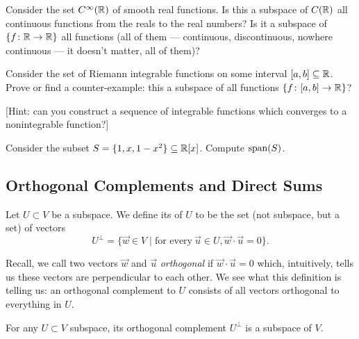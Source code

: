 \begin{exercise}
Consider the set $C^{\infty}(\mathbb{R})$ of smooth real functions.
Is this a subspace of $C(\mathbb{R})$ all continuous functions from the reals
to the real numbers?
Is it a subspace of $\{f\colon\mathbb{R}\to\mathbb{R}\}$ all functions (all of them --- continuous,
discontinuous, nowhere continuous --- it doesn't matter, all of them)?
\end{exercise}

\begin{exercise}
Consider the set of Riemann integrable functions on some interval
$[a,b]\subseteq\mathbb{R}$. Prove or find a counter-example: this a subspace of all functions $\{f\colon[a,b]\to\mathbb{R}\}$?

[Hint: can you construct a sequence of integrable functions which
  converges to a nonintegrable function?]
\end{exercise}

\begin{exercise}
Consider the subset $S = \{1,x,1-x^{2}\}\subseteq\mathbb{R}[x]$. Compute $\operatorname{span}(S)$.
\end{exercise}

\subsection{Orthogonal Complements and Direct Sums}

\begin{definition}
Let $U\subset V$ be a subspace. We define its 
of $U$ to be the set (not subspace, but a set) of vectors
\begin{equation}
U^{\perp} = \{\vec{w}\in V\mid \mbox{for every}~\vec{u}\in U, \vec{w}\cdot\vec{u}=0\}.
\end{equation}
\end{definition}

\begin{remark}
Recall, we call two vectors $\vec{w}$ and $\vec{u}$ \emph{orthogonal}
if $\vec{w}\cdot\vec{u}=0$ which, intuitively, tells us these vectors
are perpendicular to each other.
We see what this definition is telling us: an orthogonal complement to
$U$ consists of all vectors orthogonal to everything in $U$.
\end{remark}

\begin{proposition}
For any $U\subset V$ subspace, its orthogonal complement $U^{\perp}$ is
a subspace of $V$.
\end{proposition}

